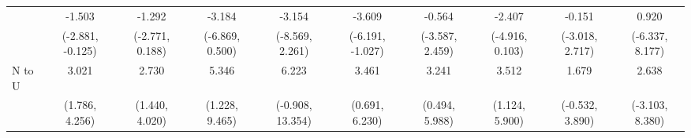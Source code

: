 {\begin{tabular}{l|c|c|c|c|c|c|c|c|c}
& -1.503 & -1.292 & -3.184 & -3.154 & -3.609 & -0.564 & -2.407 & -0.151 & 0.920 \\
& {\scriptsize (-2.881, -0.125)}
& {\scriptsize (-2.771, 0.188)}
& {\scriptsize (-6.869, 0.500)}
& {\scriptsize (-8.569, 2.261)}
& {\scriptsize (-6.191, -1.027)}
& {\scriptsize (-3.587, 2.459)}
& {\scriptsize (-4.916, 0.103)}
& {\scriptsize (-3.018, 2.717)}
& {\scriptsize (-6.337, 8.177)}
\\ [0.1cm]
\hline
N to U
& 3.021 & 2.730 & 5.346 & 6.223 & 3.461 & 3.241 & 3.512 & 1.679 & 2.638 \\
& {\scriptsize (1.786, 4.256)}
& {\scriptsize (1.440, 4.020)}
& {\scriptsize (1.228, 9.465)}
& {\scriptsize (-0.908, 13.354)}
& {\scriptsize (0.691, 6.230)}
& {\scriptsize (0.494, 5.988)}
& {\scriptsize (1.124, 5.900)}
& {\scriptsize (-0.532, 3.890)}
& {\scriptsize (-3.103, 8.380)}
\\ [0.1cm]
\hline
\hline
\end{tabular}
}
